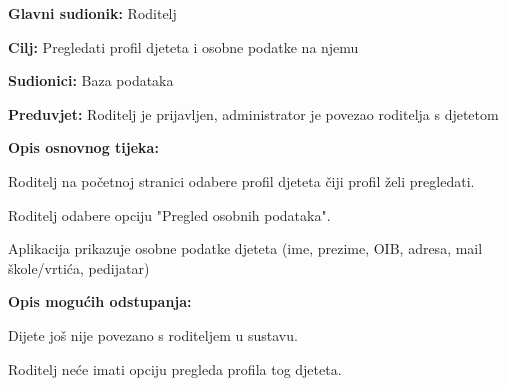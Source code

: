 					\noindent {}
					\begin{packed_item}
						
						\item \textbf{Glavni sudionik: }Roditelj
						\item  \textbf{Cilj:} Pregledati profil djeteta i osobne podatke na njemu
						\item  \textbf{Sudionici:} Baza podataka
						\item  \textbf{Preduvjet:} Roditelj je prijavljen, administrator je povezao roditelja s djetetom
						\item  \textbf{Opis osnovnog tijeka:}
						
						\item[] \begin{packed_enum}
							
							\item Roditelj na početnoj stranici odabere profil djeteta čiji profil želi pregledati. 
							\item Roditelj odabere opciju "Pregled osobnih podataka".
							\item Aplikacija prikazuje osobne podatke djeteta (ime, prezime, OIB, adresa, mail škole/vrtića, pedijatar)
						\end{packed_enum}
						
						\item  \textbf{Opis mogućih odstupanja:}
						
						\item[] \begin{packed_item}
							
							\item[1.a] Dijete još nije povezano s roditeljem u sustavu.
							\item[] \begin{packed_enum}
								
								\item Roditelj neće imati opciju pregleda profila tog djeteta.
								
								
							\end{packed_enum}
						
							
						\end{packed_item}
					\end{packed_item}
					
